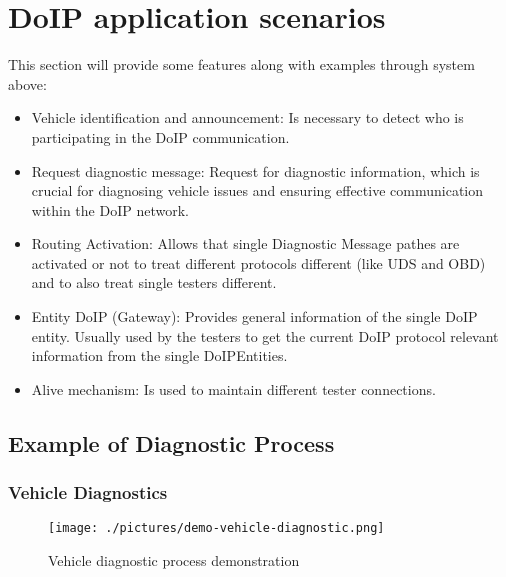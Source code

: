 \section{DoIP application scenarios}

This section will provide some features along with examples through system above:
\begin{itemize}

    \item Vehicle identification and announcement: Is necessary to detect who is participating in the DoIP communication.

    \item Request diagnostic message: Request for diagnostic information, which is crucial for diagnosing vehicle issues 
    and ensuring effective communication within the DoIP network.

    \item Routing Activation: Allows that single Diagnostic Message pathes are activated or not to treat different protocols 
    different (like UDS and OBD) and to also treat single testers different.
        
    \item Entity DoIP (Gateway): Provides general information of the single DoIP entity. Usually used by the testers to get the
     current DoIP protocol relevant information from the single DoIPEntities.

    \item Alive mechanism: Is used to maintain different tester connections.

\end{itemize}

    \subsection{Example of Diagnostic Process}

        \subsubsection{Vehicle Diagnostics}

            \begin{figure}[htbp]
                \centering
                \texttt{[image: ./pictures/demo-vehicle-diagnostic.png]}
                \caption{Vehicle diagnostic process demonstration}
                \label{fig:2.3}
            \end{figure}

